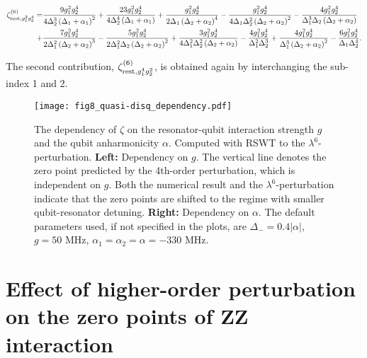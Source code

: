 \documentclass[%
 reprint,
 amsmath,amssymb,
 aps,
pra,
noeprint,
superscriptaddress,
]{revtex4-2}
\begin{document}
\begin{widetext}
\begin{align}
   \zeta^{(6)}_{\textnormal{rest}, g_{1}^{2} g_{2}^{4}}
   = & \frac{9 g_{1}^{2} g_{2}^{4}}{4 \Delta_{2}^{3} \left(\Delta_{1} + \alpha_{1}\right)^{2}}
   + \frac{23 g_{1}^{2} g_{2}^{4}}{4 \Delta_{2}^{4} \left(\Delta_{1} + \alpha_{1}\right)}
   + \frac{g_{1}^{2} g_{2}^{4}}{2 \Delta_{1} \left(\Delta_{2} + \alpha_{2}\right)^{4}}
   - \frac{g_{1}^{2} g_{2}^{4}}{4 \Delta_{1} \Delta_{2}^{2} \left(\Delta_{2} + \alpha_{2}\right)^{2}}
   - \frac{4 g_{1}^{2} g_{2}^{4}}{\Delta_{1}^{3} \Delta_{2} \left(\Delta_{2} + \alpha_{2}\right)}
    \nonumber \\
   + & \frac{7 g_{1}^{2} g_{2}^{4}}{2 \Delta_{1}^{2} \left(\Delta_{2} + \alpha_{2}\right)^{3}}
   - \frac{5 g_{1}^{2} g_{2}^{4}}{2 \Delta_{1}^{2} \Delta_{2} \left(\Delta_{2} + \alpha_{2}\right)^{2}}
   + \frac{3 g_{1}^{2} g_{2}^{4}}{4 \Delta_{1}^{2} \Delta_{2}^{2} \left(\Delta_{2} + \alpha_{2}\right)}
   - \frac{4 g_{1}^{2} g_{2}^{4}}{\Delta_{1}^{2} \Delta_{2}^{3}}
   + \frac{4 g_{1}^{2} g_{2}^{4}}{\Delta_{1}^{3} \left(\Delta_{2} + \alpha_{2}\right)^{2}}
   - \frac{6 g_{1}^{2} g_{2}^{4}}{\Delta_{1} \Delta_{2}^{4}}
   .
\end{align}
\end{widetext}
The second contribution, $\zeta^{(6)}_{\textnormal{rest}, g_{1}^{4} g_{2}^{2}}$, is obtained again by interchanging the sub-index 1 and 2.


\begin{figure*}
    \centering
    \texttt{[image: fig8\_quasi-disq\_dependency.pdf]}
    \caption{The dependency of $\zeta$ on the resonator-qubit interaction strength $g$ and the qubit anharmonicity $\alpha$.
    Computed with RSWT to the $\lambda^6$-perturbation.
    {\bf Left:} Dependency on $g$. The vertical line denotes the zero point predicted by the 4th-order perturbation, which is independent on $g$. Both the numerical result and the $\lambda^6$-perturbation indicate that the zero points are shifted to the regime with smaller qubit-resonator detuning.
    {\bf Right:} Dependency on $\alpha$.
    The default parameters used, if not specified in the plots, are $\Delta_-=0.4|\alpha|$, $g=50$ MHz, $\alpha_1=\alpha_2=\alpha=-330$ MHz.
    }
    \label{fig:quasi disq dependency on g and alpha}
\end{figure*}

\section{Effect of higher-order perturbation on the zero points of ZZ interaction}
\label{sec:quasi disq dependency on g and alpha}
\end{document}
